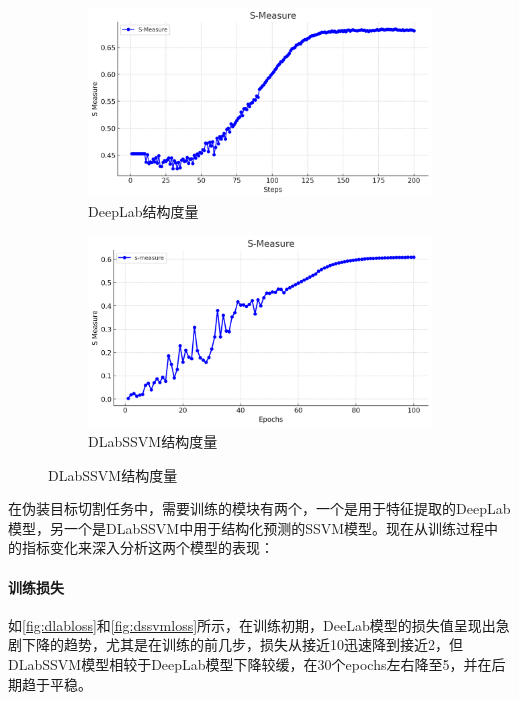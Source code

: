 \documentclass[a4paper,12pt]{ctexart}
\begin{document}
\begin{figure}[h!]
    \begin{subfigure}{0.4\textwidth}
        \centering
        \includegraphics[width=\linewidth]{figures/deeplab_smeasure.png}
        \caption{DeepLab结构度量}
        \label{fig:dlabsm}
    \end{subfigure}%
    \hspace{0.1\textwidth}
    \begin{subfigure}{0.4\textwidth}
        \centering
        \includegraphics[width=\linewidth]{figures/ssvm_smeasure.png}
        \caption{DLabSSVM结构度量}
        \label{fig:dssvmsm}
    \end{subfigure}%
\end{figure}

在伪装目标切割任务中，需要训练的模块有两个，一个是用于特征提取的DeepLab模型，另一个是DLabSSVM中用于结构化预测的SSVM模型。现在从训练过程中的指标变化来深入分析这两个模型的表现：

\paragraph{训练损失}如\ref{fig:dlabloss}和\ref{fig:dssvmloss}所示，在训练初期，DeeLab模型的损失值呈现出急剧下降的趋势，尤其是在训练的前几步，损失从接近10迅速降到接近2，但DLabSSVM模型相较于DeepLab模型下降较缓，在30个epochs左右降至5，并在后期趋于平稳。
\end{document}
